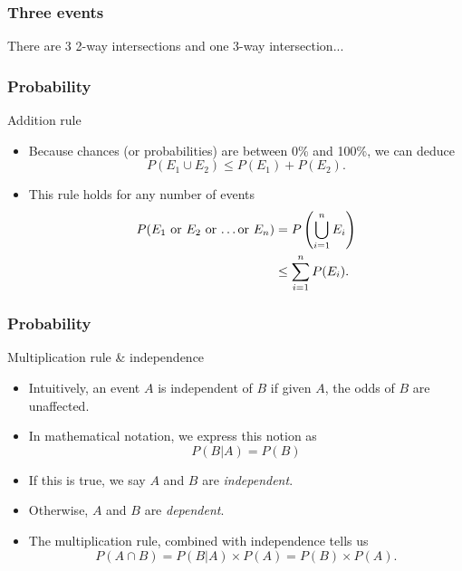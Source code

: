 \documentclass[handout]{beamer}
\begin{document}
   \begin{frame}
   \frametitle{Three events}
   \begin{center}
   \end{center}
   There are 3 2-way intersections and one 3-way intersection...
   \end{frame}


   \begin{frame} \frametitle{Probability}

   \begin{block}
   {Addition rule}
   \begin{itemize}
   \item Because chances (or probabilities) are between 0\% and 100\%,
   we can deduce
   $$
   P(E_1 \cup E_2) \leq P(E_1) + P(E_2).
   $$
   \item This rule holds for any number of events
   $$
   \begin{aligned}
   P(\text{$E_1$ or $E_2$ or \dots or $E_n$}) &= P \left(\bigcup_{i=1}^n E_i \right) \\
   & \leq \sum_{i=1}^n P(E_i).
   \end{aligned}
   $$

   \end{itemize}
   \end{block}
   \end{frame}


   \begin{frame} \frametitle{Probability}

   \begin{block}
   {Multiplication rule \& independence}
   \begin{itemize}
   \item Intuitively, an event $A$ is independent of $B$ if given $A$,
   the odds of $B$ are unaffected.
   \item In mathematical notation, we express this
   notion as
   $$
   P(B|A)=P(B)
   $$
   \item If this is true, we say $A$ and $B$ are {\em independent}.
     \item Otherwise, $A$ and $B$ are {\em dependent}.
   \item The multiplication rule, combined with independence tells us
   $$
   P(A \cap B) = P(B|A) \times P(A) = P(B) \times P(A).
   $$
   \end{itemize}
   \end{block}
   \end{frame}
\end{document}
